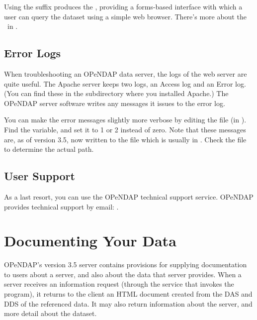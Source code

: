 \documentclass{dods-book}
\begin{document}
Using the  suffix produces the \ind{\ifh}, providing a
forms-based interface with which a user can query the dataset using a
simple web browser.  There's more about the \ifh\ in \DODSuser .

\section{Error Logs}

 When troubleshooting an OPeNDAP data
server, the logs of the web server are quite useful. The Apache server
keeps two logs, an Access log and an Error log. (You can find these in
the  subdirectory where you installed Apache.) The OPeNDAP
server software writes any messages it issues to the error log.

You can make the error messages slightly more verbose by editing the
 file (in ). Find
the  variable, and set it to 1 or 2 instead of zero. Note
that these messages are, as of version 3.5, now written to the
 file which is usually in .
Check the  file to determine the actual path.

\section{User Support}

 As a last resort, you can use
the OPeNDAP technical support service. OPeNDAP provides technical
support by email: \DODSsupport.

\chapter{Documenting Your Data}
\label{sec,document-data}

 OPeNDAP's version 3.5 server
contains provisions for supplying documentation to users about a
server, and also about the data that server provides. When a server
receives an information request (through the  service that
invokes the  program), it returns to the client an HTML
document created from the DAS and DDS of the referenced data. It may
also return information about the server, and more detail about the
dataset. 
\end{document}
